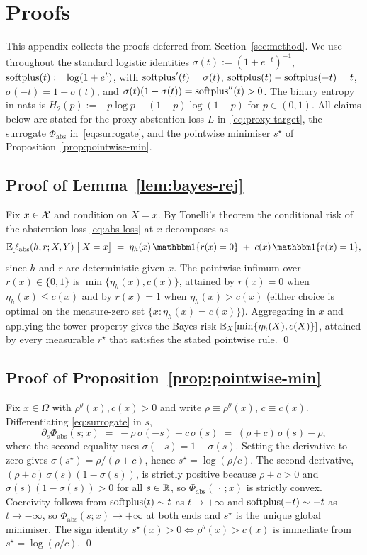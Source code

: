 \section{Proofs}
\label{app:proofs}

This appendix collects the proofs deferred from
Section~\ref{sec:method}. We use throughout the standard logistic
identities $\sigma(t):=(1+e^{-t})^{-1}$, $\operatorname{softplus}(t):=\log(1+e^{t})$,
with $\operatorname{softplus}'(t)=\sigma(t)$, $\operatorname{softplus}(t)-\operatorname{softplus}(-t)=t$,
$\sigma(-t)=1-\sigma(t)$, and $\sigma(t)(1-\sigma(t))=\operatorname{softplus}''(t)>0$.
The binary entropy in nats is
$H_2(p):=-p\log p-(1-p)\log(1-p)$ for $p\in(0,1)$. All claims below are
stated for the proxy abstention loss $L$ in~\eqref{eq:proxy-target},
the surrogate $\Phi_{\mathrm{abs}}$ in~\eqref{eq:surrogate}, and the
pointwise minimiser $s^\star$ of Proposition~\ref{prop:pointwise-min}.

\subsection{Proof of Lemma~\ref{lem:bayes-rej}}
\label{app:bayes}

Fix $x\in\mathcal{X}$ and condition on $X=x$. By Tonelli's theorem the
conditional risk of the abstention loss \eqref{eq:abs-loss} at $x$
decomposes as
\[
  \E\!\bigl[\ell_{\mathrm{abs}}(h,r;X,Y)\bigm|X=x\bigr]
  \;=\;\eta_h(x)\,\ind\{r(x)=0\}\;+\;c(x)\,\ind\{r(x)=1\},
\]
since $h$ and $r$ are deterministic given $x$. The pointwise infimum
over $r(x)\in\{0,1\}$ is $\min\{\eta_h(x),c(x)\}$, attained by $r(x)=0$
when $\eta_h(x)\leq c(x)$ and by $r(x)=1$ when $\eta_h(x)>c(x)$
(either choice is optimal on the measure-zero set
$\{x:\eta_h(x)=c(x)\}$). Aggregating in $x$ and applying the tower
property gives the Bayes risk
$\mathbb{E}_X[\min\{\eta_h(X),c(X)\}]$, attained by every measurable $r^\star$
that satisfies the stated pointwise rule. \qed

\subsection{Proof of Proposition~\ref{prop:pointwise-min}}
\label{app:pointwise-min}

Fix $x\in\Omega$ with $\rho^\theta(x),c(x)>0$ and write
$\rho\equiv\rho^\theta(x)$, $c\equiv c(x)$. Differentiating
\eqref{eq:surrogate} in $s$,
\[
  \partial_s\Phi_{\mathrm{abs}}(s;x)
  \;=\;-\rho\,\sigma(-s)+c\,\sigma(s)
  \;=\;(\rho+c)\,\sigma(s)-\rho,
\]
where the second equality uses $\sigma(-s)=1-\sigma(s)$. Setting the
derivative to zero gives $\sigma(s^\star)=\rho/(\rho+c)$, hence
$s^\star=\log(\rho/c)$. The second derivative,
$(\rho+c)\,\sigma(s)(1-\sigma(s))$, is strictly positive because
$\rho+c>0$ and $\sigma(s)(1-\sigma(s))>0$ for all $s\in\mathbb{R}$, so
$\Phi_{\mathrm{abs}}(\,\cdot\,;x)$ is strictly convex. Coercivity follows
from $\operatorname{softplus}(t)\sim t$ as $t\to+\infty$ and $\operatorname{softplus}(-t)\sim -t$ as
$t\to-\infty$, so $\Phi_{\mathrm{abs}}(s;x)\to+\infty$ at both ends and
$s^\star$ is the unique global minimiser. The sign identity
$s^\star(x)>0\Leftrightarrow\rho^\theta(x)>c(x)$ is immediate from
$s^\star=\log(\rho/c)$. \qed

